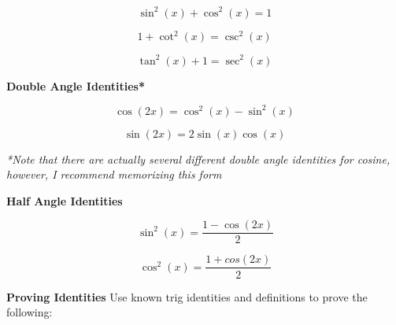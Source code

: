 \documentclass[addpoints]{exam}
\begin{document}
\begin{tcolorbox}[breakable, title=TRIG IDENTITIES, colframe=black, sharp corners, colback=white, colbacktitle=white, coltitle=black]
        \begin{minipage}{0.3\linewidth}
            \[
            \sin^2\left(x\right) + \cos^2(x) = 1
            \]
        \end{minipage}
        \hfill
        \begin{minipage}{0.3\linewidth}
            \[
            1 + \cot^2(x) = \csc^2(x)
            \]
        \end{minipage}
        \hfill
        \begin{minipage}{0.3\linewidth}
           \[
            \tan^2(x) + 1 = \sec^2(x)
           \] 
        \end{minipage}
        \newline 
        \begin{center}
            \textbf{Double Angle Identities\small{*}}
        \end{center}
        \begin{minipage}{0.45\linewidth}
            \[
            \cos(2x)=\cos^2(x) - \sin^2(x)
            \]
        \end{minipage}
        \hfill
        \begin{minipage}{0.45\linewidth}
            \[
            \sin(2x)=2\sin(x)\cos(x)
            \]
        \end{minipage}
        \newline\textit{*Note that there are actually several different double angle identities for cosine, however, I recommend memorizing this form}
        \newline 
        \begin{center}
            \textbf{Half Angle Identities}
        \end{center}
        \begin{minipage}{0.45\linewidth}
            \[\displaystyle\,
            \sin^2(x)=\frac{1-\cos(2x)}{2}
            \]
        \end{minipage}
        \hfill
        \begin{minipage}{0.45\linewidth}
            \[\displaystyle\,
            \cos^2(x)=\frac{1+cos(2x)}{2} 
            \]
        \end{minipage}
        \noindent\makebox[\linewidth]{\hrulefill}
        \vspace{0.1in}
        \newline\Large\textbf{Proving Identities}
        \newline\normalsize Use known trig identities and definitions to prove the following:
        \begin{questions}

\end{questions}
\end{tcolorbox}
\end{document}
